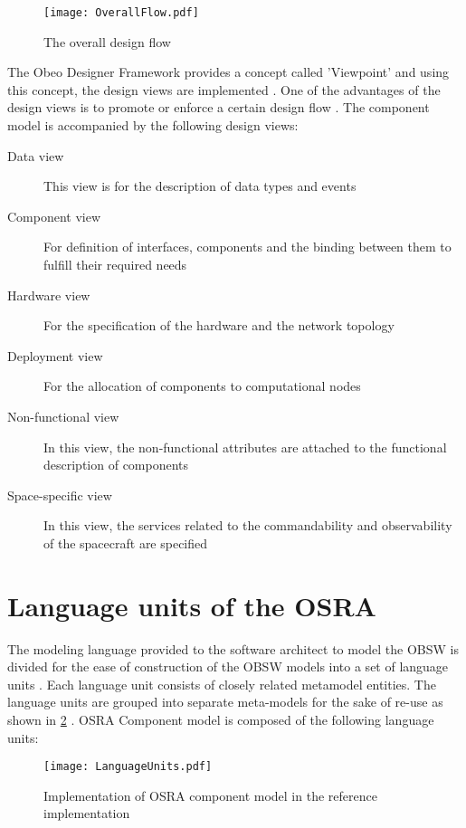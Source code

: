 \begin{figure}[h]
	\centering
	\texttt{[image: OverallFlow.pdf]}
	\caption{The overall design flow}
	\label{fig: Design flow}
\end{figure}

The Obeo Designer Framework provides a concept called 'Viewpoint' and using this concept, the design views are implemented \cite{CompBasedProcess}. One of the advantages of the design views is to promote or enforce a certain design flow \cite{CompBasedProcess}. The component model is accompanied by the following design views:
\begin{description}
\item [Data view] This view is for the description of data types and events
\item [Component view] For definition of interfaces, components and the binding between them to fulfill their required needs
\item [Hardware view] For the specification of the hardware and the network topology
\item [Deployment view] For the allocation of components to computational nodes
\item [Non-functional view] In this view, the non-functional attributes are attached to the functional description of components
\item [Space-specific view] In this view, the services related to the commandability and observability of the spacecraft are specified
\end{description}  

\section{Language units of the OSRA}
\label{Language units}
The modeling language provided to the software architect to model the OBSW is divided for the ease of construction of the OBSW models into a set of language units \cite{SpecMetamodel}. Each language unit consists of closely related metamodel entities. The language units are grouped into separate meta-models for the sake of re-use as shown in \cref{fig: Language units} \cite{SpecMetamodel}. OSRA Component model is composed of the following language units:

\begin{figure}[h]
	\centering
	\texttt{[image: LanguageUnits.pdf]}
	\caption{Implementation of OSRA component model in the reference implementation}
	\label{fig: Language units}
\end{figure}


